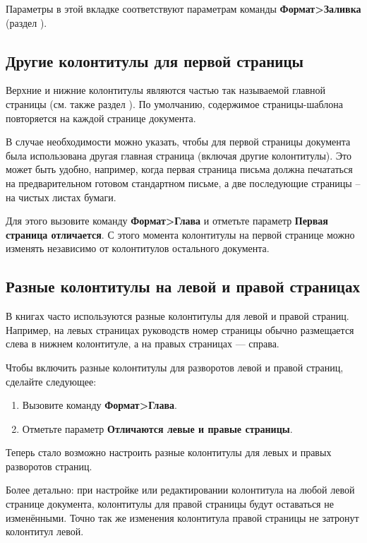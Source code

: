 ﻿\documentclass[a4paper,10pt]{article}
\begin{document}
Параметры в этой вкладке соответствуют параметрам команды \textbf{Формат>Заливка} (раздел ).

\subsection{Другие колонтитулы для первой страницы}
Верхние и нижние колонтитулы являются частью так называемой главной страницы (см. также раздел ). По умолчанию, содержимое страницы-шаблона повторяется на каждой странице документа.

В случае необходимости можно указать, чтобы для первой страницы документа была использована другая главная страница (включая другие колонтитулы). Это может быть удобно, например, когда первая страница письма должна печататься на предварительном готовом стандартном письме, а две последующие страницы -- на чистых листах бумаги.

Для этого вызовите команду \textbf{Формат>Глава} и отметьте параметр \textbf{Первая страница отличается}. С этого момента колонтитулы на первой странице можно изменять независимо от колонтитулов остального документа.

\subsection{Разные колонтитулы на левой и правой страницах}
В книгах часто используются разные колонтитулы для левой и правой страниц. Например, на левых страницах руководств номер страницы обычно размещается слева в нижнем колонтитуле, а на правых страницах — справа.

Чтобы включить разные колонтитулы для разворотов левой и правой страниц, сделайте следующее:

\begin{enumerate}
 \item Вызовите команду \textbf{Формат>Глава}.
 \item Отметьте параметр \textbf{Отличаются левые и правые страницы}.
\end{enumerate}

Теперь стало возможно настроить разные колонтитулы для левых и правых разворотов страниц.

Более детально: при настройке или редактировании колонтитула на любой левой странице документа, колонтитулы для правой страницы будут оставаться не изменёнными. Точно так же изменения колонтитула правой страницы не затронут колонтитул левой.
\end{document}

